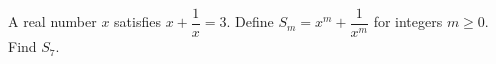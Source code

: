 A real number $x$ satisfies $x+\dfrac{1}{x}=3$. Define $S_m=x^m+\dfrac{1}{x^m}$ for integers $m\ge0$. Find $S_7$.
